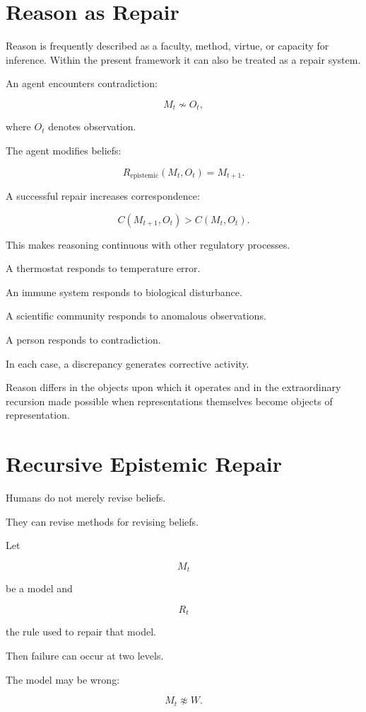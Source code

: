 \documentclass[11pt,oneside]{book}
\theoremstyle{definition}
\theoremstyle{remark}
\begin{document}
\section{Reason as Repair}

Reason is frequently described as a faculty, method, virtue, or capacity for inference. Within the present framework it can also be treated as a repair system.

An agent encounters contradiction:

\[
M_t
\not\sim
O_t,
\]

where \(O_t\) denotes observation.

The agent modifies beliefs:

\[
R_{\mathrm{epistemic}}(M_t,O_t)
=
M_{t+1}.
\]

A successful repair increases correspondence:

\[
C(M_{t+1},O_t)
>
C(M_t,O_t).
\]

This makes reasoning continuous with other regulatory processes.

A thermostat responds to temperature error.

An immune system responds to biological disturbance.

A scientific community responds to anomalous observations.

A person responds to contradiction.

In each case, a discrepancy generates corrective activity.

Reason differs in the objects upon which it operates and in the extraordinary recursion made possible when representations themselves become objects of representation.

\section{Recursive Epistemic Repair}

Humans do not merely revise beliefs.

They can revise methods for revising beliefs.

Let

\[
M_t
\]

be a model and

\[
R_t
\]

the rule used to repair that model.

Then failure can occur at two levels.

The model may be wrong:

\[
M_t\not\approx W.
\]
\end{document}
